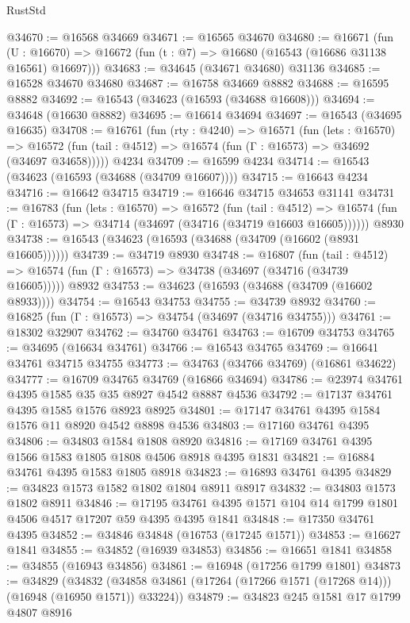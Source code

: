 \begin{lexlean}{RustStd}
\begin{coremodule}
@34670 := @16568 @34669
@34671 := @16565 @34670
@34680 := @16671
    (fun (U : @16670) => @16672 (fun (t : @7) => @16680 (@16543 (@16686 @31138 @16561) @16697)))
@34683 := @34645 (@34671 @34680) @31136
@34685 := @16528 @34670 @34680
@34687 := @16758 @34669 @8882
@34688 := @16595 @8882
@34692 := @16543 (@34623 (@16593 (@34688 @16608)))
@34694 := @34648 (@16630 @8882)
@34695 := @16614 @34694
@34697 := @16543 (@34695 @16635)
@34708 := @16761
    (fun (rty : @4240) =>
    @16571
      (fun (lets : @16570) =>
      @16572 (fun (tail : @4512) => @16574 (fun (Γ : @16573) => @34692 (@34697 @34658)))))
    @4234
@34709 := @16599 @4234
@34714 := @16543 (@34623 (@16593 (@34688 (@34709 @16607))))
@34715 := @16643 @4234
@34716 := @16642 @34715
@34719 := @16646 @34715 @34653 @31141
@34731 := @16783
    (fun (lets : @16570) =>
    @16572
      (fun (tail : @4512) =>
      @16574 (fun (Γ : @16573) => @34714 (@34697 (@34716 (@34719 @16603 @16605))))))
    @8930
@34738 := @16543 (@34623 (@16593 (@34688 (@34709 (@16602 (@8931 @16605))))))
@34739 := @34719 @8930
@34748 := @16807
    (fun (tail : @4512) => @16574 (fun (Γ : @16573) => @34738 (@34697 (@34716 (@34739 @16605)))))
    @8932
@34753 := @34623 (@16593 (@34688 (@34709 (@16602 @8933))))
@34754 := @16543 @34753
@34755 := @34739 @8932
@34760 := @16825 (fun (Γ : @16573) => @34754 (@34697 (@34716 @34755)))
@34761 := @18302 @32907
@34762 := @34760 @34761
@34763 := @16709 @34753
@34765 := @34695 (@16634 @34761)
@34766 := @16543 @34765
@34769 := @16641 @34761 @34715 @34755
@34773 := @34763 (@34766 @34769) (@16861 @34622)
@34777 := @16709 @34765 @34769 (@16866 @34694)
@34786 := @23974 @34761 @4395 @1585 @35 @35 @8927 @4542 @8887 @4536
@34792 := @17137 @34761 @4395 @1585 @1576 @8923 @8925
@34801 := @17147 @34761 @4395 @1584 @1576 @11 @8920 @4542 @8898 @4536
@34803 := @17160 @34761 @4395
@34806 := @34803 @1584 @1808 @8920
@34816 := @17169 @34761 @4395 @1566 @1583 @1805 @1808 @4506 @8918 @4395 @1831
@34821 := @16884 @34761 @4395 @1583 @1805 @8918
@34823 := @16893 @34761 @4395
@34829 := @34823 @1573 @1582 @1802 @1804 @8911 @8917
@34832 := @34803 @1573 @1802 @8911
@34846 := @17195 @34761 @4395 @1571 @104 @14 @1799 @1801 @4506 @4517 @17207 @59 @4395 @4395 @1841
@34848 := @17350 @34761 @4395
@34852 := @34846 @34848 (@16753 (@17245 @1571))
@34853 := @16627 @1841
@34855 := @34852 (@16939 @34853)
@34856 := @16651 @1841
@34858 := @34855 (@16943 @34856)
@34861 := @16948 (@17256 @1799 @1801)
@34873 := @34829
    (@34832 (@34858 @34861 (@17264 (@17266 @1571 (@17268 @14))) (@16948 (@16950 @1571)) @33224))
@34879 := @34823 @245 @1581 @17 @1799 @4807 @8916

\end{coremodule}
\end{lexlean}
